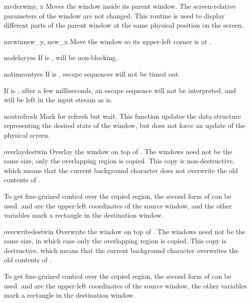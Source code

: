 \begin{methoddesc}{mvderwin}{y, x}
Moves the window inside its parent window.  The screen-relative
parameters of the window are not changed.  This routine is used to
display different parts of the parent window at the same physical
position on the screen.
\end{methoddesc}

\begin{methoddesc}{mvwin}{new_y, new_x}
Move the window so its upper-left corner is at
.
\end{methoddesc}

\begin{methoddesc}{nodelay}{yes}
If  is ,  will be non-blocking.
\end{methoddesc}

\begin{methoddesc}{notimeout}{yes}
If  is , escape sequences will not be timed out.

If  is , after a few milliseconds, an escape sequence
will not be interpreted, and will be left in the input stream as is.
\end{methoddesc}

\begin{methoddesc}{noutrefresh}{}
Mark for refresh but wait.  This function updates the data structure
representing the desired state of the window, but does not force
an update of the physical screen.
\end{methoddesc}

\begin{methoddesc}{overlay}{destwin}
Overlay the window on top of . The windows need not be
the same size, only the overlapping region is copied. This copy is
non-destructive, which means that the current background character
does not overwrite the old contents of .

To get fine-grained control over the copied region, the second form
of  can be used.  and  are
the upper-left coordinates of the source window, and the other variables
mark a rectangle in the destination window.
\end{methoddesc}

\begin{methoddesc}{overwrite}{destwin}
Overwrite the window on top of . The windows need not be
the same size, in which case only the overlapping region is
copied. This copy is destructive, which means that the current
background character overwrites the old contents of .

To get fine-grained control over the copied region, the second form
of  can be used.  and  are
the upper-left coordinates of the source window, the other variables
mark a rectangle in the destination window.
\end{methoddesc}

